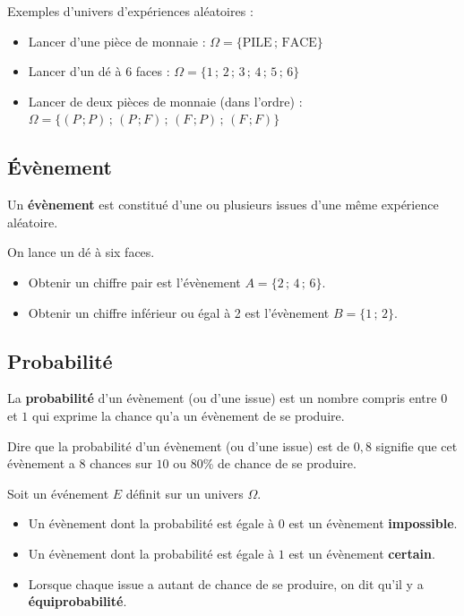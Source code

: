 \begin{exemple}
	Exemples d'univers d'expériences aléatoires :
	\begin{itemize}
		\item {Lancer d'une pièce de monnaie :} $\Omega = \{\text{PILE} \,;\, \text{FACE}\}$
		\item {Lancer d'un dé à 6 faces :} $\Omega = \{1 \,;\, 2 \,;\, 3 \,;\, 4 \,;\, 5 \,;\, 6\}$
		\item {Lancer de deux pièces de monnaie (dans l'ordre) :} $\Omega = \{(P\,;P) \,;\, (P\,;F) \,;\, (F\,;P) \,;\, (F\,;F)\}$
	\end{itemize}
\end{exemple}
\subsection{Évènement}
\begin{definition}
	Un \textbf{évènement} est constitué d'une ou plusieurs issues d'une même expérience aléatoire.
\end{definition}
\begin{exemple}
	On lance un dé à six faces.
	\begin{itemize}
		\item \og{}Obtenir un chiffre pair\fg{} est l'évènement $A = \{2 \,;\, 4 \,;\, 6\}$.
		\item \og{}Obtenir un chiffre inférieur ou égal à 2\fg{} est l'évènement $B = \{1 \,;\, 2\}$.
	\end{itemize}
\end{exemple}

\subsection{Probabilité}

\begin{definition}
	La \textbf{probabilité} d'un évènement (ou d'une issue) est un nombre compris entre $0$ et $1$ qui exprime \og{}la chance\fg{} qu'a un évènement de se produire.
\end{definition}

\begin{exemple}
	Dire que la probabilité d'un évènement (ou d'une issue) est de $0,8$ signifie que cet évènement a $8$ chances sur $10$ ou $80$\% de chance de se produire.
\end{exemple}

\begin{remarque}
	Soit un événement $E$ définit sur un univers $\Omega$.
	\begin{itemize}
		\item Un évènement dont la probabilité est égale à $0$ est un évènement \textbf{impossible}.
		\item Un évènement dont la probabilité est égale à $1$ est un évènement \textbf{certain}.
		\item Lorsque chaque issue a autant de chance de se produire, on dit qu'il y a \textbf{équiprobabilité}.
	\end{itemize}
\end{remarque}

